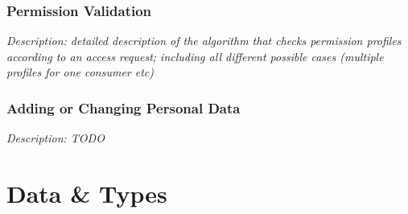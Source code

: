 \documentclass[12pt,english,a4paper,titlepage,cleardoublepage=empty,dottedtoc]{report}
\begin{document}
\subsubsection{Permission Validation}\label{permission-validation}

\emph{Description: detailed description of the algorithm that checks
permission profiles according to an access request; including all
different possible cases (multiple profiles for one consumer etc)}

\subsubsection{Adding or Changing Personal
Data}\label{adding-or-changing-personal-data}

\emph{Description: TODO}

\section{Data \& Types}\label{data-types}
\end{document}
